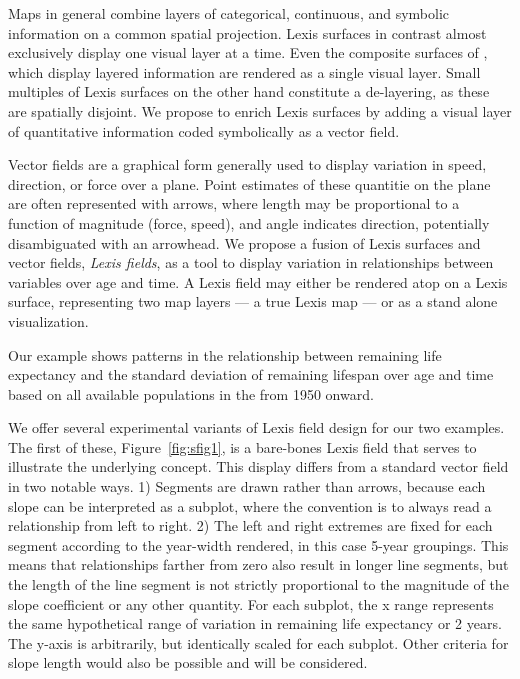 \documentclass{article}
\begin{document}
Maps in general combine layers of categorical, continuous, and
symbolic information on a common spatial projection. Lexis surfaces in contrast almost exclusively display one visual layer at a time. Even the composite surfaces of \citet{scholey2017visualizing}, which display layered information are rendered as a single visual layer. Small multiples of Lexis surfaces on the other hand constitute a de-layering, as these are spatially disjoint. We propose to enrich Lexis surfaces by adding a visual layer of quantitative information coded symbolically as a vector field.

Vector fields are a graphical form generally used to display variation in speed,
direction, or force over a plane. Point estimates of these quantitie on the plane are
often represented with arrows, where length may be proportional to a function of
magnitude (force, speed), and angle indicates direction, potentially disambiguated with an arrowhead. We propose a fusion of Lexis surfaces and vector fields, \emph{Lexis fields}, as a tool to
display variation in relationships between variables over age and time. A Lexis field may either be rendered atop on a Lexis surface, representing two map layers --- a true Lexis map --- or as a stand alone visualization. 

Our example shows patterns in the relationship between remaining life expectancy and
the standard deviation of remaining lifespan over age and time based on all
available populations in the \citet{HMD} from 1950 onward. 



We offer several experimental variants of Lexis field design for our two
examples. The first of these, Figure~\ref{fig:sfig1}, is a bare-bones Lexis field that serves to illustrate the underlying concept. This display differs from a standard vector field in two notable ways. 1) Segments are drawn rather than arrows, because each slope can be
interpreted as a subplot, where the convention is to always read a
relationship from left to right. 2) The left and right extremes are fixed for
each segment according to the year-width rendered, in this case 5-year
groupings. This means that relationships farther from zero also result in longer
line segments, but the length of the line segment is not strictly proportional
to the magnitude of the slope coefficient or any other quantity. For each
subplot, the x range represents the same hypothetical range of
variation in remaining life expectancy or 2 years. The y-axis is arbitrarily,
but identically scaled for each subplot. Other criteria for slope length would
also be possible and will be considered.
\end{document}
